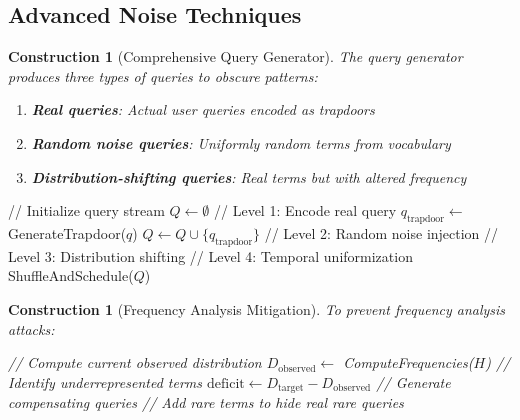 \documentclass[11pt,final,hidelinks]{article}
\newtheorem{construction}[theorem]{Construction}
\begin{document}
\subsection{Advanced Noise Techniques}

\begin{construction}[Comprehensive Query Generator]
The query generator produces three types of queries to obscure patterns:
\begin{enumerate}
    \item \textbf{Real queries}: Actual user queries encoded as trapdoors
    \item \textbf{Random noise queries}: Uniformly random terms from vocabulary
    \item \textbf{Distribution-shifting queries}: Real terms but with altered frequency
\end{enumerate}
\end{construction}

\begin{algorithm}[H]
\caption{Advanced Query Generator with Multiple Strategies}
// Initialize query stream\;
$Q \gets \emptyset$\;
// Level 1: Encode real query\;
$q_{\text{trapdoor}} \gets$ GenerateTrapdoor($q$)\;
$Q \gets Q \cup \{q_{\text{trapdoor}}\}$\;
// Level 2: Random noise injection\;
// Level 3: Distribution shifting\;
// Level 4: Temporal uniformization\;
ShuffleAndSchedule($Q$)\;
\end{algorithm}

\begin{construction}[Frequency Analysis Mitigation]
To prevent frequency analysis attacks:
\begin{algorithm}[H]
\caption{Distribution-Flattening Query Generator}
// Compute current observed distribution\;
$D_{\text{observed}} \gets$ ComputeFrequencies($H$)\;
// Identify underrepresented terms\;
$\text{deficit} \gets D_{\text{target}} - D_{\text{observed}}$\;
// Generate compensating queries\;
// Add rare terms to hide real rare queries\;
\end{algorithm}
\end{construction}
\end{document}
